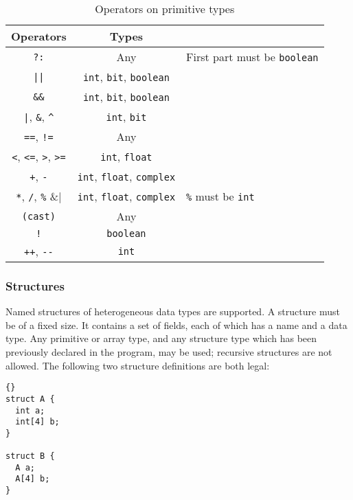 \documentclass[11pt]{article}
\begin{document}
\begin{table}
\begin{center}
\begin{tabular}{ccl}
\toprule
\textbf{Operators} & \textbf{Types} \\
\midrule
\lstinline|?:| & Any & First part must be \lstinline|boolean| \\
\lstinline/||/ & \lstinline|int|, \lstinline|bit|, \lstinline|boolean| \\
\lstinline|&&| & \lstinline|int|, \lstinline|bit|, \lstinline|boolean| \\
\lstinline/|/, \lstinline|&|, \lstinline|^| &
  \lstinline|int|, \lstinline|bit| \\
\lstinline|==|, \lstinline|!=| & Any \\
\lstinline|<|, \lstinline|<=|, \lstinline|>|, \lstinline|>=| &
  \lstinline|int|, \lstinline|float| \\
\lstinline|+|, \lstinline|-| &
  \lstinline|int|, \lstinline|float|, \lstinline|complex| \\
\lstinline|*|, \lstinline|/|, \lstinline|%| &
  \lstinline|int|, \lstinline|float|, \lstinline|complex| &
  \lstinline|%| must be \lstinline|int| \\
\lstinline|(cast)| & Any \\
\lstinline|!| & \lstinline|boolean| \\
\lstinline|++|, \lstinline|--| & \lstinline|int| \\
\bottomrule
\end{tabular}
\end{center}
\caption{Operators on primitive types}
\label{tab:primitive-operators}
\end{table}

\subsubsection{Structures}
\label{sec:data-structures}

Named structures of heterogeneous data types are supported.  A
structure must be of a fixed size.  It contains a set of fields, each
of which has a name and a data type.  Any primitive or array type, and
any structure type which has been previously declared in the program,
may be used; recursive structures are not allowed.  The following two
structure definitions are both legal:

\begin{lstlisting}{}
struct A {
  int a;
  int[4] b;
}

struct B {
  A a;
  A[4] b;
}
\end{lstlisting}
\end{document}
